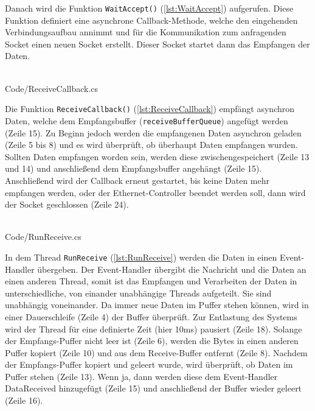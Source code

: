Danach wird die Funktion \texttt{WaitAccept()} (\autoref{lst:WaitAccept}) aufgerufen. Diese Funktion definiert eine asynchrone Callback-Methode, welche den eingehenden Verbindungsaufbau annimmt und für die Kommunikation zum anfragenden Socket einen neuen Socket erstellt. Dieser Socket startet dann das Empfangen der Daten. 
\ \\
\begin{minipage}{\textwidth}
\ \\
 {Code/ReceiveCallback.cs}
\ \\
\end{minipage}
Die Funktion \texttt{ReceiveCallback()} (\autoref{lst:ReceiveCallback}) empfängt asynchron Daten, welche dem Empfangsbuffer (\texttt{\textunderscore receiveBufferQueue}) angefügt werden (Zeile 15). Zu Beginn jedoch werden die empfangenen Daten asynchron geladen (Zeile 5 bis 8) und es wird überprüft, ob überhaupt Daten empfangen wurden. Sollten Daten empfangen worden sein, werden diese zwischengespeichert (Zeile 13 und 14) und anschließend dem Empfangsbuffer angehängt (Zeile 15). Anschließend wird der Callback erneut gestartet, bis keine Daten mehr empfangen werden, oder der Ethernet-Controller beendet werden soll, dann wird der Socket geschlossen (Zeile 24).
\ \\
\begin{minipage}{\textwidth}
\ \\
 {Code/RunReceive.cs}
\ \\
\end{minipage}
In dem Thread \texttt{RunReceive} (\autoref{lst:RunReceive}) werden die Daten in einen Event-Handler übergeben. Der Event-Handler übergibt die Nachricht und die Daten an einen anderen Thread, somit ist das Empfangen und Verarbeiten der Daten in unterschiedliche, von einander unabhängige Threads aufgeteilt. Sie sind unabhängig voneinander. Da immer neue Daten im Puffer stehen können, wird in einer Dauerschleife (Zeile 4) der Buffer überprüft. Zur Entlastung des Systems wird der Thread für eine definierte Zeit (hier 10ms) pausiert (Zeile 18). Solange der Empfangs-Puffer nicht leer ist (Zeile 6), werden die Bytes in einen anderen Puffer kopiert (Zeile 10) und aus dem Receive-Buffer entfernt (Zeile 8). Nachdem der Empfangs-Puffer kopiert und geleert wurde, wird überprüft, ob Daten im Puffer stehen (Zeile 13). Wenn ja, dann werden diese dem Event-Handler \glqq DataReceived\grqq{} hinzugefügt (Zeile 15) und anschließend der Buffer wieder geleert (Zeile 16). 






